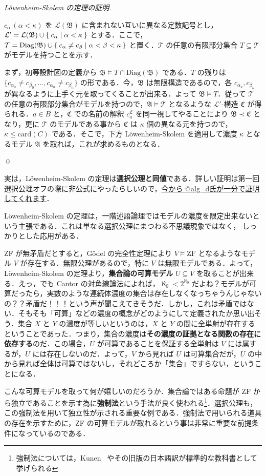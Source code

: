 \documentclass[a4j]{jsarticle}
\newcommand{\Diag}{\mathrm{Diag}}
\newcommand{\card}{\mathrm{card}}
\begin{document}
\begin{proof}[L\"{o}wenheim-Skolem の定理の証明]
\begin{enumerate}[label=(\alph{*})]
	$c_\alpha \, (\alpha < \kappa)$ を $\mathcal{L}(\mathfrak{B})$ に含まれない互いに異なる定数記号とし，$\mathcal{L}' = \mathcal{L}(\mathfrak{B}) \cup \Set{ c_\alpha | \alpha < \kappa }$ とする．ここで，$\mathcal{T} = \Diag(\mathfrak{B}) \cup \Set{ c_\alpha \neq c_\beta | \alpha < \beta < \kappa}$ と置く．$\mathcal{T}$ の任意の有限部分集合 $T \subseteq \mathcal{T}$ がモデルを持つことを示す．

	まず，初等設計図の定義から $\mathfrak{B} \models T \cap \Diag(\mathfrak{B})$ である．$T$ の残りは $\{c_{\alpha_0} \neq c_{\beta_0}, \dots, c_{\alpha_n} \neq c_{\beta_n}\}$ の形である．今，$\mathfrak{B}$ は無限構造であるので，各 $c_{\alpha_k}, c_{\beta_k}$ が異なるように上手く元を取ってくることが出来る．よって $\mathfrak{B} \models T$．従って $\mathcal{T}$ の任意の有限部分集合がモデルを持つので，$\mathfrak{A} \models \mathcal{T}$ となるような $\mathcal{L}'$-構造 $\mathfrak{C}$ が得られる．$a \in B$ と，$\mathfrak{C}$ での名前の解釈 $c_a^\mathfrak{C}$ を同一視してやることにより $\mathfrak{B} \prec \mathfrak{C}$ となり，更に $\mathcal{T}$ のモデルである事から $\mathfrak{C}$ は $\kappa$ 個の異なる元を持つので，$\kappa \leq\card(C)$ である．そこで，下方 L\"{o}wenheim-Skolem を適用して濃度 $\kappa$ となるモデル $\mathfrak{A}$ を取れば，これが求めるものとなる． 
 \end{enumerate}\qed
\end{proof}

実は，L\"{o}wenheim-Skolem の定理は{\bfseries 選択公理と同値}である．詳しい証明は第一回選択公理オフの際に非公式にやったらしいので，\href{http://alg-d.com/math/ac/loewenheim_skolem.html}{今から @alg\_d氏が一分で証明してくれます}．

L\"{o}wenheim-Skolem の定理は，一階述語論理ではモデルの濃度を限定出来ないという主張である．これは単なる選択公理にまつわる不思議現象ではなく，
しっかりとした応用がある．

ZF が無矛盾だとすると，G\"{o}del の完全性定理により $V \models \mathrm{ZF}$ となるようなモデル $V$ が存在する．無限公理があるので，特に $V$ は無限モデルである．よって，L\"{o}wenheim-Skolem の定理より，{\bfseries 集合論の可算モデル} $U \subseteq V$ を取ることが出来る．えっ，でも Cantor の対角線論法によれば，$\aleph_0 < 2^{\aleph_0}$ だよね？モデルが可算だったら，実数のような連続体濃度の集合は存在しなくなっちゃうんじゃないの？？矛盾だ！！！という声が聞こえてきそうだ．しかし，これは矛盾ではない．そもそも「可算」などの濃度の概念がどのようにして定義されたか思い出そう．集合 $X$ と $Y$ の濃度が等しいというのは，$X$ と $Y$ の間に全単射が存在するということであった．つまり，集合の濃度は{\bfseries その濃度の証拠となる関数の存在に依存する}のだ．この場合，$U$ が可算であることを保証する全単射は $V$ には属するが，$U$ には存在しないのだ．よって，$V$ から見れば $U$ は可算集合だが，$U$ の中から見れば全体は可算ではないし，それどころか「集合」ですらない，ということになる．

こんな可算モデルを取って何が嬉しいのだろうか．集合論ではある命題が ZF から独立であることを示す為に{\bfseries 強制法}という手法が良く使われる\footnote{強制法については，Kunen~\cite{Kunen:2011} やその旧版の日本語訳が標準的な教科書として挙げられる}．選択公理も，この強制法を用いて独立性が示される重要な例である．強制法で用いられる道具の存在を示すために，ZF の可算モデルが取れるという事は非常に重要な前提条件になっているのである．

\nocite{*}

\end{document}
